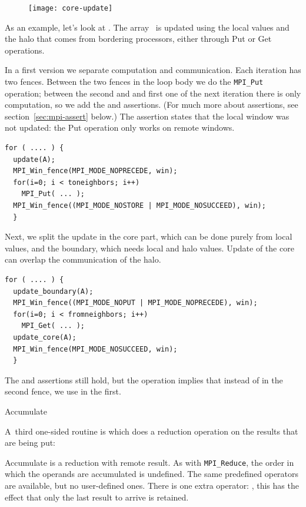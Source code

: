 \begin{figure}
  \texttt{[image: core-update]}
\end{figure}
%
As an example, let's look at .
The array~ is updated using the local values and the halo
that comes from bordering processors, either through Put or Get operations.

In a first version we separate computation and communication.
Each iteration has two fences. Between the two fences in the loop body
we do the \lstinline$MPI_Put$ operation; between the second and and first one
of the next iteration there is only computation, so we add the
 and  assertions. (For much more about
assertions, see section~\ref{sec:mpi-assert} below.)
The  assertion
states that the local window was not updated: the Put operation only
works on remote windows.
\begin{lstlisting}
for ( .... ) {
  update(A); 
  MPI_Win_fence(MPI_MODE_NOPRECEDE, win); 
  for(i=0; i < toneighbors; i++) 
    MPI_Put( ... );
  MPI_Win_fence((MPI_MODE_NOSTORE | MPI_MODE_NOSUCCEED), win); 
  }
\end{lstlisting}

Next, we split the update in the core part, which can be done purely
from local values, and the boundary, which needs local and halo
values. Update of the core can overlap the communication of the halo.
\begin{lstlisting}
for ( .... ) {
  update_boundary(A); 
  MPI_Win_fence((MPI_MODE_NOPUT | MPI_MODE_NOPRECEDE), win); 
  for(i=0; i < fromneighbors; i++) 
    MPI_Get( ... );
  update_core(A); 
  MPI_Win_fence(MPI_MODE_NOSUCCEED, win); 
  }
\end{lstlisting}
The  and  assertions still hold, but the
 operation implies that instead of  in the
second fence, we use  in the first.

 {Accumulate}

A~third one-sided routine
is  which does a reduction operation on the results
that are being put:


Accumulate is a reduction with remote result. As with \lstinline$MPI_Reduce$, the 
order in which the operands are accumulated is undefined. 
The same predefined operators are available, but no
user-defined ones. There is one extra operator: ,
this has the effect that only the last result to arrive is retained.

